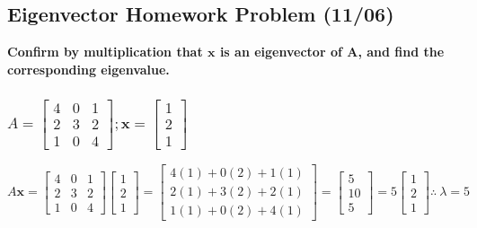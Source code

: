 \documentclass[
  letterpaper,
  DIV=11,
  numbers=noendperiod]{scrartcl}
\begin{document}
\subsection{Eigenvector Homework Problem
(11/06)}\label{eigenvector-homework-problem-1106}

\textbf{Confirm by multiplication that \(\symbf{x}\) is an eigenvector
of \(\symbf{A}\), and find the corresponding eigenvalue.}

\subsubsection{\texorpdfstring{\(A = \begin{bmatrix}4 & 0 & 1 \\ 2 & 3 & 2 \\ 1 & 0 & 4 \end{bmatrix}; \symbf{x} = \begin{bmatrix}1 \\ 2 \\ 1\end{bmatrix}\)}{A = \textbackslash begin\{bmatrix\}4 \& 0 \& 1 \textbackslash\textbackslash{} 2 \& 3 \& 2 \textbackslash\textbackslash{} 1 \& 0 \& 4 \textbackslash end\{bmatrix\}; \textbackslash symbf\{x\} = \textbackslash begin\{bmatrix\}1 \textbackslash\textbackslash{} 2 \textbackslash\textbackslash{} 1\textbackslash end\{bmatrix\}}}\label{a-beginbmatrix4-0-1-2-3-2-1-0-4-endbmatrix-symbfx-beginbmatrix1-2-1endbmatrix}

\(A\symbf{x} = \begin{bmatrix}4 & 0 & 1 \\ 2 & 3 & 2 \\ 1 & 0 & 4 \end{bmatrix}\begin{bmatrix}1 \\ 2 \\ 1\end{bmatrix} = \begin{bmatrix}4(1)+0(2)+1(1) \\ 2(1)+3(2)+2(1) \\ 1(1)+0(2)+4(1)\end{bmatrix} = \begin{bmatrix}5 \\ 10 \\ 5\end{bmatrix} = 5\begin{bmatrix}1 \\ 2 \\ 1\end{bmatrix} \therefore \ \lambda = 5\)
\end{document}
